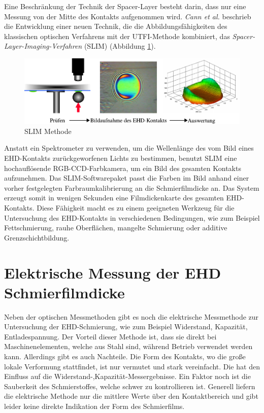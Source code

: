 Eine Beschränkung der Technik der Spacer-Layer besteht darin, dass nur eine Messung von der Mitte des Kontakts aufgenommen wird.
\textit{Cann et al.} \cite{cann_1996} beschrieb die Entwicklung einer neuen Technik, die die Abbildungsfähigkeiten des klassischen optischen Verfahrens mit der UTFI-Methode kombiniert, das \textit{Spacer-Layer-Imaging-Verfahren} (SLIM) (Abbildung \ref{fig:ehd_slim_methode}).
\begin{figure}[htb]
    \centering
    \includegraphics[]{./images/slim_methode.pdf}
    \caption{SLIM Methode \cite{ehl_broshure}}
    \label{fig:ehd_slim_methode}
\end{figure}
%

Anstatt ein Spektrometer zu verwenden, um die Wellenlänge des vom Bild eines EHD-Kontakts zurückgeworfenen Lichts zu bestimmen, benutzt SLIM eine hochauflösende RGB-CCD-Farbkamera, um ein Bild des gesamten Kontakts aufzunehmen.
Das SLIM-Softwarepaket passt die Farben im Bild anhand einer vorher festgelegten Farbraumkalibrierung an die Schmierfilmdicke an.
Das System erzeugt somit in wenigen Sekunden eine Filmdickenkarte des gesamten EHD-Kontakts.
Diese Fähigkeit macht es zu einem geeigneten Werkzeug für die Untersuchung des EHD-Kontakts in verschiedenen Bedingungen, wie zum Beispiel Fettschmierung, rauhe Oberflächen, mangelte Schmierung oder additive Grenzschichtbildung.

\section{Elektrische Messung der EHD Schmierfilmdicke}
\label{sec:elektrische_messung_der_ehd_schmierfilmdicke}

Neben der optischen Messmethoden gibt es noch die elektrische Messmethode zur Untersuchung der EHD-Schmierung, wie zum Beispiel Widerstand, Kapazität, Entladespannung.
Der Vorteil dieser Methode ist, dass sie direkt bei Maschinenelementen, welche aus Stahl sind, während Betrieb verwendet werden kann.
Allerdings gibt es auch Nachteile.
Die Form des Kontakts, wo die große lokale Verformung stattfindet, ist nur vermutet und stark vereinfacht.
Die hat den Einfluss auf die Widerstand-,Kapazität-Messergebnisse.
Ein Faktor noch ist die Sauberkeit des Schmierstoffes, welche schwer zu kontrollieren ist.
Generell liefern die elektrische Methode nur die mittlere Werte über den Kontaktbereich und gibt leider keine direkte Indikation der Form des Schmierfilms.

